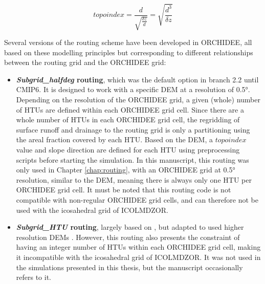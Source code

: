 \begin{equation}
    topoindex = \frac{d}{\sqrt{\frac{\delta z}{d}}} = \sqrt{ \frac{d^3}{\delta z} } 
\end{equation}

\hfill

Several versions of the routing scheme have been developed in ORCHIDEE, all based on these modelling principles but corresponding to different relationships between the routing grid and the ORCHIDEE grid:

\begin{itemize}
\item \textbf{\textit{Subgrid\_halfdeg} routing}, which was the default option in branch 2.2 until CMIP6. It is designed to work with a specific DEM at a resolution of 0.5°.
Depending on the resolution of the ORCHIDEE grid, a given (whole) number of HTUs are defined within each ORCHIDEE grid cell. Since there are a whole number of HTUs in each ORCHIDEE grid cell, the regridding of surface runoff and drainage to the routing grid is only a partitioning using the areal fraction covered by each HTU.
Based on the DEM, a $topoindex$ value and slope direction are defined for each HTU using preprocessing scripts before starting the simulation.
In this manuscript, this routing was only used in Chapter \ref{chap:routing},  with an ORCHIDEE grid at 0.5° resolution, similar to the DEM, meaning there is always only one HTU per ORCHIDEE grid cell. 
It must be noted that this routing code is not compatible with non-regular ORCHIDEE grid cells, and can therefore not be used with the icosahedral grid of ICOLMDZOR.

\item \textbf{\textit{Subgrid\_HTU} routing}, largely based on \std, but adapted to used higher resolution DEMs \citep{nguyen-quang_orchidee-routing_2018, polcher_hydrological_2023}. However, this routing  also presents the constraint of having an integer number of HTUs within each ORCHIDEE grid cell, making it incompatible with the icosahedral grid of ICOLMDZOR. It was not used in the simulations presented in this thesis, but the manuscript occasionally refers to it.


\end{itemize}
